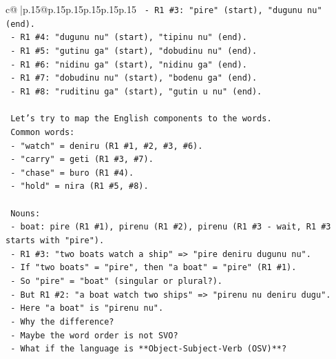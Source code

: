 \documentclass{article}
\begin{document}
{\begin{supertabular}{c@{$\;$}|p{.15\linewidth}@{}p{.15\linewidth}p{.15\linewidth}p{.15\linewidth}p{.15\linewidth}p{.15\linewidth}}
{{{\texttt{                      {-} R1 \#3: "pire" (start), "dugunu nu" (end).} \\
\texttt{                      {-} R1 \#4: "dugunu nu" (start), "tipinu nu" (end).} \\
\texttt{                      {-} R1 \#5: "gutinu ga" (start), "dobudinu nu" (end).} \\
\texttt{                      {-} R1 \#6: "nidinu ga" (start), "nidinu ga" (end).} \\
\texttt{                      {-} R1 \#7: "dobudinu nu" (start), "bodenu ga" (end).} \\
\texttt{                      {-} R1 \#8: "ruditinu ga" (start), "gutin u nu" (end).} \\
\\ 
\texttt{                Let's try to map the English components to the words.} \\
\texttt{                Common words:} \\
\texttt{                {-} "watch" = deniru (R1 \#1, \#2, \#3, \#6).} \\
\texttt{                {-} "carry" = geti (R1 \#3, \#7).} \\
\texttt{                {-} "chase" = buro (R1 \#4).} \\
\texttt{                {-} "hold" = nira (R1 \#5, \#8).} \\
\\ 
\texttt{                Nouns:} \\
\texttt{                {-} boat: pire (R1 \#1), pirenu (R1 \#2), pirenu (R1 \#3 {-} wait, R1 \#3 starts with "pire").} \\
\texttt{                  {-} R1 \#3: "two boats watch a ship" => "pire deniru dugunu nu".} \\
\texttt{                  {-} If "two boats" = "pire", then "a boat" = "pire" (R1 \#1).} \\
\texttt{                  {-} So "pire" = "boat" (singular or plural?).} \\
\texttt{                  {-} But R1 \#2: "a boat watch two ships" => "pirenu nu deniru dugu".} \\
\texttt{                  {-} Here "a boat" is "pirenu nu".} \\
\texttt{                  {-} Why the difference?} \\
\texttt{                  {-} Maybe the word order is not SVO?} \\
\texttt{                  {-} What if the language is **Object{-}Subject{-}Verb (OSV)**?} \\
}}}
\end{supertabular}}
\end{document}
